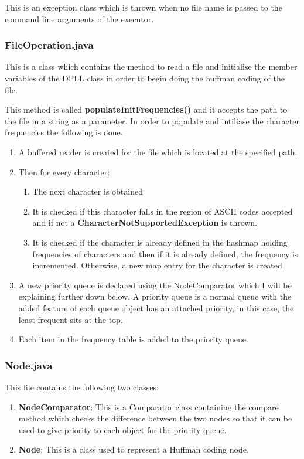 \documentclass{article}
\begin{document}
		This is an exception class which is thrown when no file name is passed to the command line arguments of the executor.
		
		
		\subsubsection{FileOperation.java}
		
		This is a class which contains the method to read a file and initialise the member variables of the DPLL class in order to begin doing the huffman coding of the file.
		
		This method is called \textbf{populateInitFrequencies()} and it accepts the path to the file in a string as a parameter. In order to populate and intiliase the character frequencies the following is done.
		
		\begin{enumerate}
			\item A buffered reader is created for the file which is located at  the specified path.
			\item Then for every character:
				\begin{enumerate}
					\item The next character is obtained
					\item It is checked if this character falls in the region of ASCII codes accepted and if not a \textbf{CharacterNotSupportedException} is thrown.
					\item It is checked if the character is already defined in the hashmap holding frequencies of characters and then if it is already defined, the frequency is incremented. Otherwise, a new map entry for the character is created.
				\end{enumerate}
\item A new priority queue is declared using the NodeComparator which I will be explaining further down below. A priority queue is a normal queue with the added feature of each queue object has an attached priority, in this case, the least frequent sits at the top. 
\item Each item in the frequency table is added to the priority queue.
		\end{enumerate}
		
				\subsubsection{Node.java}
		
		This file contains the following two classes:
		\begin{enumerate}
			\item \textbf{NodeComparator}: This is a Comparator class containing the compare method which checks the difference between the two nodes so that it can be used to give priority to each object for the priority queue.
			\item \textbf{Node}: This is a class used to represent a Huffman coding node. 
		\end{enumerate}
		
\end{document}
